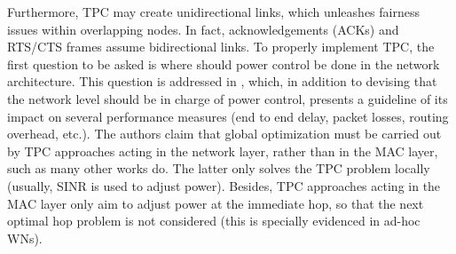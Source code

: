 \documentclass[12pt, a4paper,twoside]{tesi_upf}
\begin{document}
				Furthermore, TPC may create unidirectional links, which unleashes fairness issues within overlapping nodes. In fact, acknowledgements (ACKs) and RTS/CTS frames assume bidirectional links. To properly implement TPC, the first question to be asked is where should power control be done in the network architecture. This question is addressed in \cite{kawadia2005principles}, which, in addition to devising that the network level should be in charge of power control, presents a guideline of its impact on several performance measures (end to end delay, packet losses, routing overhead, etc.). The authors claim that global optimization must be carried out by TPC approaches acting in the network layer, rather than in the MAC layer, such as many other works do. The latter only solves the TPC problem locally (usually, SINR is used to adjust power). Besides, TPC approaches acting in the MAC layer only aim to adjust power at the immediate hop, so that the next optimal hop problem is not considered (this is specially evidenced in ad-hoc WNs).
				
\end{document}
